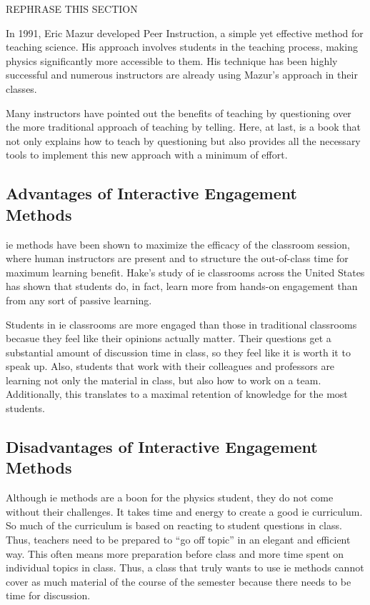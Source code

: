 REPHRASE THIS SECTION

In 1991, Eric Mazur developed Peer Instruction, a simple yet effective method for teaching science. His approach involves students in the teaching process, making physics significantly more accessible to them. His technique has been highly successful and numerous instructors are already using Mazur's approach in their classes.

Many instructors have pointed out the benefits of teaching by questioning over the more traditional approach of teaching by telling. Here, at last, is a book that not only explains how to teach by questioning but also provides all the necessary tools to implement this new approach with a minimum of effort\cite{mazur1997}.

\subsection{Advantages of Interactive Engagement Methods}

\gls{ie} methods have been shown to maximize the efficacy of the classroom session, where human instructors are present and to structure the out-of-class time for maximum learning benefit. Hake's study of \gls{ie} classrooms across the United States has shown that students do, in fact, learn more from hands-on engagement than from any sort of passive learning.

Students in \gls{ie} classrooms are more engaged than those in traditional classrooms becasue they feel like their opinions actually matter. Their questions get a substantial amount of discussion time in class, so they feel like it is worth it to speak up. Also, students that work with their colleagues and professors are learning not only the material in class, but also how to work on a team. Additionally, this translates to a maximal retention of knowledge for the most students\cite{novak1999}.

\subsection{Disadvantages of Interactive Engagement Methods}

Although \gls{ie} methods are a boon for the physics student, they do not come without their challenges. It takes time and energy to create a good \gls{ie} curriculum. So much of the curriculum is based on reacting to student questions in class. Thus, teachers need to be prepared to ``go off topic'' in an elegant and efficient way. This often means more preparation before class and more time spent on individual topics in class. Thus, a class that truly wants to use \gls{ie} methods cannot cover as much material of the course of the semester because there needs to be time for discussion.

